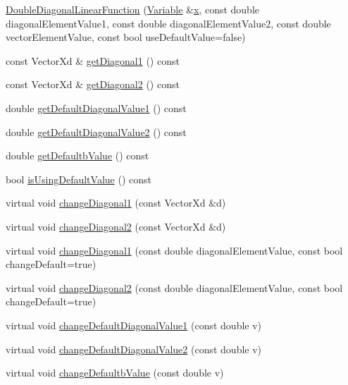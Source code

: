 \begin{DoxyCompactItemize}
\item 
\hyperlink{classocra_1_1DoubleDiagonalLinearFunction_aa46fa50d5728569eb834438dfd3a9228}{Double\+Diagonal\+Linear\+Function} (\hyperlink{classocra_1_1Variable}{Variable} \&\hyperlink{classocra_1_1Function_a28825886d1f149c87b112ec2ec1dd486}{x}, const double diagonal\+Element\+Value1, const double diagonal\+Element\+Value2, const double vector\+Element\+Value, const bool use\+Default\+Value=false)
\item 
const Vector\+Xd \& \hyperlink{classocra_1_1DoubleDiagonalLinearFunction_a16aecbb63865f331e8d590a456259316}{get\+Diagonal1} () const 
\item 
const Vector\+Xd \& \hyperlink{classocra_1_1DoubleDiagonalLinearFunction_a08e6a825ce2c35bfefd6cf1cf5dd68ca}{get\+Diagonal2} () const 
\item 
double \hyperlink{classocra_1_1DoubleDiagonalLinearFunction_a9b1fe9c5ec1b6bbd168e62bde3d5a973}{get\+Default\+Diagonal\+Value1} () const 
\item 
double \hyperlink{classocra_1_1DoubleDiagonalLinearFunction_a83da78143e933e542960ca7c40e574b4}{get\+Default\+Diagonal\+Value2} () const 
\item 
double \hyperlink{classocra_1_1DoubleDiagonalLinearFunction_a7e939b84aaee9d8df11d8f9d84bf13e0}{get\+Defaultb\+Value} () const 
\item 
bool \hyperlink{classocra_1_1DoubleDiagonalLinearFunction_a7e24d472689c67b2b53ef905224ac82d}{is\+Using\+Default\+Value} () const 
\item 
virtual void \hyperlink{classocra_1_1DoubleDiagonalLinearFunction_aa49e6964582aa9da6c02bacb68937e4d}{change\+Diagonal1} (const Vector\+Xd \&d)
\item 
virtual void \hyperlink{classocra_1_1DoubleDiagonalLinearFunction_aa6ec35d1e7abf6300e7ba37e42c3b467}{change\+Diagonal2} (const Vector\+Xd \&d)
\item 
virtual void \hyperlink{classocra_1_1DoubleDiagonalLinearFunction_ace71385fd62acf0749cbcf96a0477868}{change\+Diagonal1} (const double diagonal\+Element\+Value, const bool change\+Default=true)
\item 
virtual void \hyperlink{classocra_1_1DoubleDiagonalLinearFunction_a1a9ec0f7bb11ae2f1ddd6dffceea8921}{change\+Diagonal2} (const double diagonal\+Element\+Value, const bool change\+Default=true)
\item 
virtual void \hyperlink{classocra_1_1DoubleDiagonalLinearFunction_a982adc5313b550ac6fa3b420051a9505}{change\+Default\+Diagonal\+Value1} (const double v)
\item 
virtual void \hyperlink{classocra_1_1DoubleDiagonalLinearFunction_a1380c4f6f99af312d2eae2b0355be4cc}{change\+Default\+Diagonal\+Value2} (const double v)
\item 
virtual void \hyperlink{classocra_1_1DoubleDiagonalLinearFunction_a8af650affad3759e7a069d0cabcd4c2e}{change\+Defaultb\+Value} (const double v)
\end{DoxyCompactItemize}
